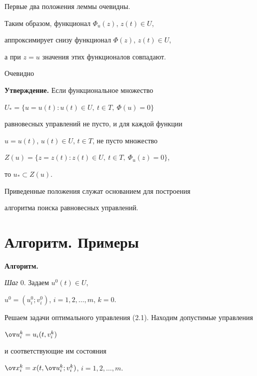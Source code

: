 Первые два положения леммы очевидны.





Таким образом, функционал $\Phi_u(z)$, $z(t){\in} U$,


аппроксимирует снизу функционал $\Phi(z)$, $z(t){\in} U$,


а при $z=u$ значения этих функционалов совпадают.





Очевидно


\medskip





{\bf Утверждение.} Если функциональное множество 


$U_{\ast}=\{u=u(t): u(t)\in U,\ t\in T,\ \Phi(u)=0\}$


равновесных управлений не пусто, и для каждой функции


$u=u(t)$, $u(t)\in U$, $t\in T$, не пусто множество


$Z(u)=\{ z=z(t):z(t)\in U,\ t\in T,\ \Phi_u(z)=0\}$,


то $u_{\ast}\subset Z(u)$.


\medskip





Приведенные положения служат основанием для построения 


алгоритма поиска равновесных управлений.





\section{Алгоритм. Примеры}





{\bf Алгоритм.}





{\it Шаг} 0. Задаем $u^0(t)\in U$,


$u^0=(u_i^0;v_i^0)$, $i=1,2,\dotsc ,m$, $k=0$.


Решаем задачи оптимального управления (2.1). Находим допустимые управления 


$\ov u_i^k=u_i(t,v_i^k)$


и соответствующие им состояния


$\ov x_i^k=x(t,\ov u_i^k;v_i^k)$, $i=1,2,\dotsc, m$.


